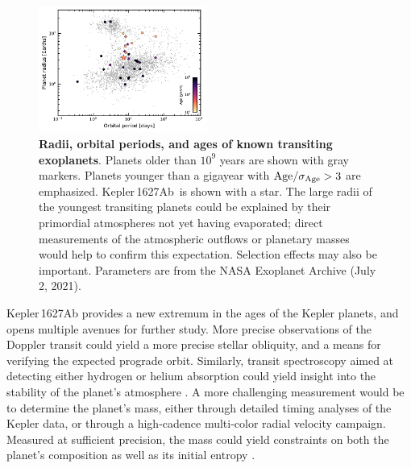 \documentclass[12pt,modern,twocolumn,tighten]{aastex63}
\newcommand{\pn}{Kepler\,1627Ab} %
\begin{document}
\begin{figure}[tp]
	\begin{center}
		\leavevmode
		\includegraphics[width=0.49\textwidth]{f14.pdf}
	\end{center}
	\vspace{-0.7cm}
	\caption{
    {\bf Radii, orbital periods, and ages of known transiting
    exoplanets}.  Planets older than $10^9$ years are shown with gray
    markers.  Planets younger than a gigayear with ${\rm
    Age}/\sigma_{\rm Age} > 3$
    are emphasized.  \pn\ is shown with a star.  The large radii
    of the youngest transiting planets could be explained by their
    primordial atmospheres not yet having evaporated; direct
    measurements of the atmospheric outflows or planetary masses would
    help to confirm this expectation.  Selection effects may also be
    important.  Parameters are from the NASA Exoplanet Archive (July
    2, 2021).
		\label{fig:rp_period_age}
	}
\end{figure}



Kepler\,1627Ab provides a new extremum in the ages of the Kepler
planets, and opens multiple avenues for further study.  More precise
observations of the Doppler transit could yield a more precise stellar
obliquity, and a means for verifying the expected prograde orbit.
Similarly, transit spectroscopy aimed at detecting either hydrogen or
helium absorption could yield insight into the stability of the
planet's atmosphere \citep[{\it
e.g.},][]{spake_helium_2018,vissapragada_2020}.  A more challenging
measurement would be to determine the planet's mass, either through
detailed timing analyses of the Kepler data, or through a high-cadence
multi-color radial velocity campaign.  Measured at
sufficient precision, the mass could yield constraints on both the
planet's composition as well as its initial entropy
\citep{owen_constraining_2020}.
\end{document}
